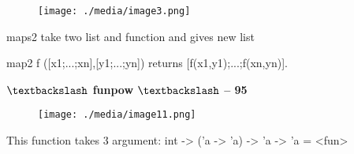 \documentclass[12pt]{article}
\renewcommand{\_}{\kern-1.5pt\textunderscore\kern-1.5pt}
\begin{document}

\begin{figure}[H]
	\begin{Center}
		\texttt{[image: ./media/image3.png]}
	\end{Center}
\end{figure}



\par


\vspace{\baselineskip}

\vspace{\baselineskip}
{\fontsize{14pt}{16.8pt}\selectfont maps2 take two list and function and gives new list\par}\par

{\fontsize{14pt}{16.8pt}\selectfont map2 f ([x1;...;xn],[y1;...;yn]) returns [f(x1,y1);...;f(xn,yn)].\par}\par


\vspace{\baselineskip}

\vspace{\baselineskip}
{\fontsize{14pt}{16.8pt}\selectfont \textbf{$\textbackslash$ funpow $\textbackslash$  -- 95}\par}\par




\begin{figure}[H]
	\begin{Center}
		\texttt{[image: ./media/image11.png]}
	\end{Center}
\end{figure}



\par


\vspace{\baselineskip}
{\fontsize{14pt}{16.8pt}\selectfont This function takes 3 argument: int -> ('a -> 'a) -> 'a -> 'a = <fun>\par}\par
\end{document}
